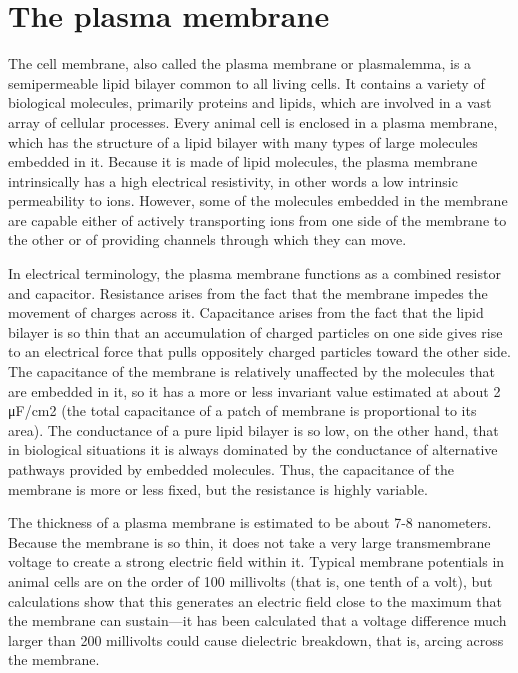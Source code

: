 \hypertarget{the-plasma-membrane}{%
\section{The plasma membrane}\label{the-plasma-membrane}}

The cell membrane, also called the plasma membrane or plasmalemma, is a semipermeable lipid bilayer common to all living cells. It contains a variety of biological molecules, primarily proteins and lipids, which are involved in a vast array of cellular processes.
Every animal cell is enclosed in a plasma membrane, which has the structure of a lipid bilayer with many types of large molecules embedded in it. Because it is made of lipid molecules, the plasma membrane intrinsically has a high electrical resistivity, in other words a low intrinsic permeability to ions. However, some of the molecules embedded in the membrane are capable either of actively transporting ions from one side of the membrane to the other or of providing channels through which they can move.

In electrical terminology, the plasma membrane functions as a combined resistor and capacitor. Resistance arises from the fact that the membrane impedes the movement of charges across it. Capacitance arises from the fact that the lipid bilayer is so thin that an accumulation of charged particles on one side gives rise to an electrical force that pulls oppositely charged particles toward the other side. The capacitance of the membrane is relatively unaffected by the molecules that are embedded in it, so it has a more or less invariant value estimated at about 2 μF/cm2 (the total capacitance of a patch of membrane is proportional to its area). The conductance of a pure lipid bilayer is so low, on the other hand, that in biological situations it is always dominated by the conductance of alternative pathways provided by embedded molecules. Thus, the capacitance of the membrane is more or less fixed, but the resistance is highly variable.

The thickness of a plasma membrane is estimated to be about 7-8 nanometers. Because the membrane is so thin, it does not take a very large transmembrane voltage to create a strong electric field within it. Typical membrane potentials in animal cells are on the order of 100 millivolts (that is, one tenth of a volt), but calculations show that this generates an electric field close to the maximum that the membrane can sustain---it has been calculated that a voltage difference much larger than 200 millivolts could cause dielectric breakdown, that is, arcing across the membrane.

